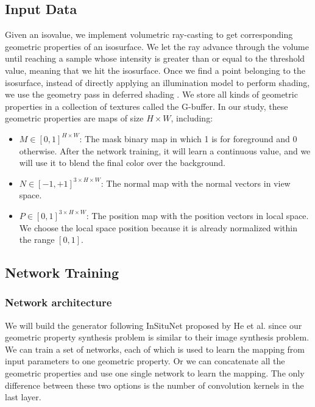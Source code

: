 \documentclass[journal]{vgtc}                %
\begin{document}
\subsection{Input Data}
Given an isovalue, we implement volumetric ray-casting to get corresponding geometric properties of an isosurface. We let the ray advance through the volume until reaching a sample whose intensity is greater than or equal to the threshold value, meaning that we hit the isosurface. Once we find a point belonging to the isosurface, instead of directly applying an illumination model to perform shading, we use the geometry pass in deferred shading \cite{deering1988triangle}. We store all kinds of geometric properties in a collection of textures called the G-buffer. In our study, these geometric properties are maps of size $ H \times W $,  including:

\begin{itemize}
\item $M \in [0, 1] ^ {H \times W}$: The mask binary map in which 1 is for foreground and 0 otherwise. After the network training, it will learn a continuous value, and we will use it to blend the final color over the background.  

\item $N \in [-1, +1] ^ {3 \times H \times W}$: The normal map with the normal vectors in view space.

\item $P \in [0, 1] ^ {3 \times H \times W}$: The position map with the position vectors in local space. We choose the local space position because it is already normalized within the range $[0, 1]$.

\end{itemize}

\subsection{Network Training}

\subsubsection{Network architecture}
We will build the generator following InSituNet proposed by He et al. \cite{he2019insitunet} since our geometric property synthesis problem is similar to their image synthesis problem. We can train a set of networks, each of which is used to learn the mapping from input parameters to one geometric property. Or we can concatenate all the geometric properties and use one single network to learn the mapping. The only difference between these two options is the number of convolution kernels in the last layer. 
\end{document}
